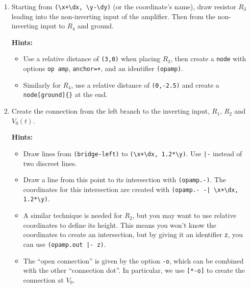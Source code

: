 \begin{enumerate}
\begin{enumerate}
        \item Starting from \verb|(\x+\dx, \y-\dy)| (or the coordinate's name), draw resistor \( R_3 \) leading into the non-inverting input of the amplifier. Then from the non-inverting input to \( R_4 \) and ground.
        
        \textbf{Hints:} \begin{itemize}
            \item Use a relative distance of \verb|(3,0)| when placing \( R_3 \), then create a \texttt{node} with options \verb|op amp|, \verb|anchor=+|, and an identifier \verb|(opamp)|.
            \item Similarly for \( R_4 \), use a relative distance of \verb|(0,-2.5)| and create a \verb|node[ground]{}| at the end.
        \end{itemize}

        \item Create the connection from the left branch to the inverting input, $R_1$, $R_2$ and $V_0(t)$.
        
        \textbf{Hints:}
        \begin{itemize}
            \item Draw lines from \texttt{(bridge-left)} to \verb|(\x+\dx, 1.2*\y)|. Use \verb!|-! instead of two discreet lines.
            \item Draw a line from this point to its intersection with \verb|(opamp.-)|. The coordinates for this intersection are created with \verb!(opamp.- -| \x+\dx, 1.2*\y)!.
            \item A similar technique is needed for \( R_2 \), but you may want to use relative coordinates to define its height. This means you won't know the coordinates to create an intersection, but by giving it an identifier \verb|z|, you can use \verb!(opamp.out |- z)!.
            \item The ``open connection'' is given by the option \verb|-o|, which can be combined with the other ``connection dot''. In particular, we use \verb|[*-o]| to create the connection at \( V_0 \). 
        \end{itemize}
    \end{enumerate}
\end{enumerate}